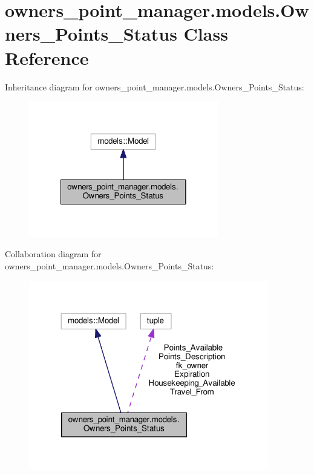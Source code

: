 \hypertarget{classowners__point__manager_1_1models_1_1Owners__Points__Status}{\section{owners\-\_\-point\-\_\-manager.\-models.\-Owners\-\_\-\-Points\-\_\-\-Status Class Reference}
\label{classowners__point__manager_1_1models_1_1Owners__Points__Status}
}


Inheritance diagram for owners\-\_\-point\-\_\-manager.\-models.\-Owners\-\_\-\-Points\-\_\-\-Status\-:
\nopagebreak
\begin{figure}[H]
\begin{center}
\leavevmode
\includegraphics[width=234pt]{classowners__point__manager_1_1models_1_1Owners__Points__Status__inherit__graph}
\end{center}
\end{figure}


Collaboration diagram for owners\-\_\-point\-\_\-manager.\-models.\-Owners\-\_\-\-Points\-\_\-\-Status\-:
\nopagebreak
\begin{figure}[H]
\begin{center}
\leavevmode
\includegraphics[width=296pt]{classowners__point__manager_1_1models_1_1Owners__Points__Status__coll__graph}
\end{center}
\end{figure}
